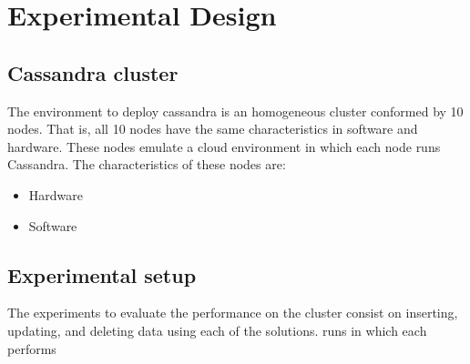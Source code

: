 \chapter{Experimental Design}


\section{Cassandra cluster}

The environment to deploy cassandra is  an homogeneous cluster conformed by 10
nodes. That is, all 10 nodes have the same characteristics in software and
hardware. These nodes emulate a cloud environment in which each node runs
Cassandra. The characteristics of these nodes are:

\begin{itemize}
  \item Hardware
  \item Software
\end{itemize}



\section{Experimental setup}
	The experiments to evaluate the performance on the cluster consist on 
	inserting, updating, and deleting data using each of the solutions.    
	runs in which each performs 
	




